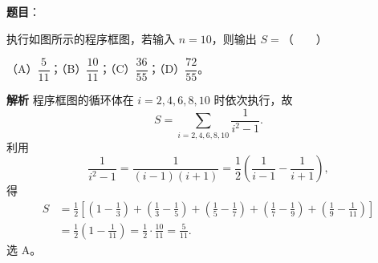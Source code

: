 \begin{answer}

\textbf{题目}：

执行如图所示的程序框图，若输入 $n=10$，则输出 $S=$\mbox{（　　）}
\nopagebreak[4]
\begin{center}\end{center}
\nopagebreak[4]
（A）$\dfrac5{11}$；（B）$\dfrac{10}{11}$；（C）$\dfrac{36}{55}$；（D）$\dfrac{72}{55}$。

\textbf{解析}
程序框图的循环体在 $i=2,4,6,8,10$ 时依次执行，故
\nopagebreak[4]
\[S=\sum_{i=2,4,6,8,10}\frac1{i^2-1}.\]
利用
\nopagebreak[4]
\[\frac1{i^2-1}=\frac1{(i-1)(i+1)}=\frac12\left(\frac1{i-1}-\frac1{i+1}\right),\]
得
\nopagebreak[4]
\[\begin{aligned}
S&=\frac12\left[\left(1-\frac13\right)+\left(\frac13-\frac15\right)+\left(\frac15-\frac17\right)
+\left(\frac17-\frac19\right)+\left(\frac19-\frac1{11}\right)\right]\\
&=\frac12\left(1-\frac1{11}\right)=\frac12\cdot\frac{10}{11}=\frac5{11}.
\end{aligned}\]
选 A。


\end{answer}
